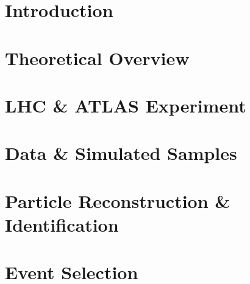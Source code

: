 \documentclass{msuphddissertation}
\begin{document}
\newpage
{}
\begin{doublespace}


{
\FormatChapterTitles  %



\chapter{Introduction}
\label{chap:intro}


\chapter{Theoretical Overview}
\label{chap:theory}


\chapter{LHC \& ATLAS Experiment}
\label{chap:LHCATLAS}


\chapter{Data \& Simulated Samples}
\label{chap:samples}


\chapter{Particle Reconstruction \& Identification}
\label{chap:obj}


\chapter{Event Selection}
\label{chap:evntsel}


}
\end{doublespace}
\end{document}
